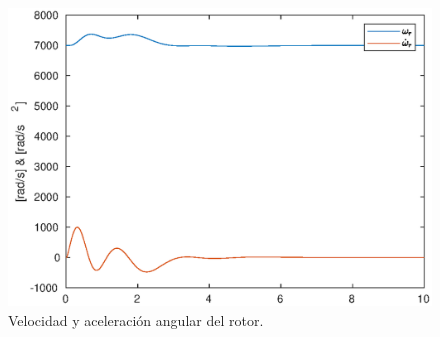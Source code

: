 \begin{figure}[!ht]
    \centering
    \includegraphics[width=0.6\linewidth]{fig/rotor_edf}
    \caption{Velocidad y aceleración angular del rotor.}
    \label{fig:rotor_edf}
\end{figure}




